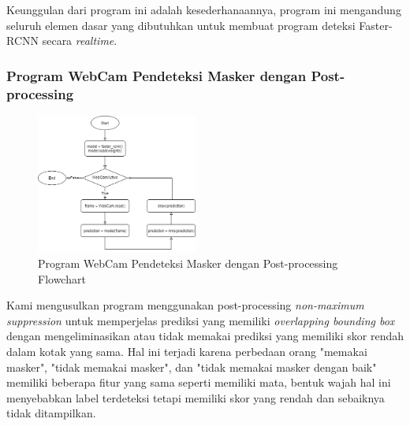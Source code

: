 \documentclass{article}
\begin{document}
	\par Keunggulan dari program ini adalah kesederhanaannya, program ini mengandung seluruh elemen dasar yang dibutuhkan untuk membuat program deteksi Faster-RCNN secara \textit{realtime}.
  	\subsubsection{Program WebCam Pendeteksi Masker dengan Post-processing}
  	\begin{figure}[H]
  		\centering
  		\includegraphics[width=200px]{arsitektur/Sequential with Postprocessing.png}
  		\caption{Program WebCam Pendeteksi Masker dengan Post-processing Flowchart}
	\end{figure}
	
	Kami mengusulkan program menggunakan post-processing \textit{non-maximum suppression} untuk memperjelas prediksi yang memiliki \textit{overlapping bounding box} dengan mengeliminasikan atau tidak memakai prediksi yang memiliki skor rendah dalam kotak yang sama. Hal ini terjadi karena perbedaan orang "memakai masker", "tidak memakai masker", dan "tidak memakai masker dengan baik" memiliki beberapa fitur yang sama seperti memiliki mata, bentuk wajah hal ini menyebabkan label terdeteksi tetapi memiliki skor yang rendah dan sebaiknya tidak ditampilkan.\\
\end{document}

